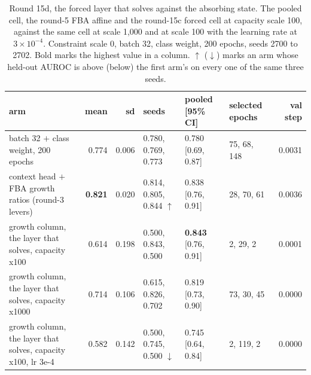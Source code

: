 \begin{table}[H]
  \centering
  \scriptsize
  \caption[Round 15d, the forced layer that solves against the absorbing state]{Round 15d, the forced layer that solves against the absorbing state. The pooled cell, the round-5 FBA affine and the round-15c forced cell at capacity scale 100, against the same cell at scale 1,000 and at scale 100 with the learning rate at $3 \times 10^{-4}$. Constraint scale 0, batch 32, class weight, 200 epochs, seeds 2700 to 2702. Bold marks the highest value in a column. $\uparrow$ ($\downarrow$) marks an arm whose held-out AUROC is above (below) the first arm's on every one of the same three seeds.}
  \label{tab:w31}
  \begin{tabular}{@{}lrrlllr@{}}
    \hline
    arm & mean & sd & seeds & pooled [95\% CI] & selected epochs & val step \\
    \hline
    batch 32 $+$ class weight, 200 epochs & 0.774 & 0.006 & 0.780, 0.769, 0.773 & 0.780 [0.69, 0.87] & 75, 68, 148 & 0.0031 \\
    context head $+$ FBA growth ratios (round-3 levers) & \textbf{0.821} & 0.020 & 0.814, 0.805, 0.844 $\uparrow$ & 0.838 [0.76, 0.91] & 28, 70, 61 & 0.0036 \\
    growth column, the layer that solves, capacity x100 & 0.614 & 0.198 & 0.500, 0.843, 0.500 & \textbf{0.843} [0.76, 0.91] & 2, 29, 2 & 0.0001 \\
    growth column, the layer that solves, capacity x1000 & 0.714 & 0.106 & 0.615, 0.826, 0.702 & 0.819 [0.73, 0.90] & 73, 30, 45 & 0.0000 \\
    growth column, the layer that solves, capacity x100, lr 3e-4 & 0.582 & 0.142 & 0.500, 0.745, 0.500 $\downarrow$ & 0.745 [0.64, 0.84] & 2, 119, 2 & 0.0000 \\
    \hline
  \end{tabular}
\end{table}
